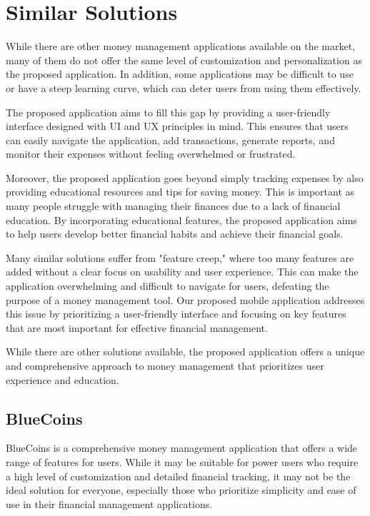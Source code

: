 \section{Similar Solutions}\label{sect:similar solutions}
\hspace{\parindent} While there are other money management applications available on the market, many of them do not offer the same level of customization and personalization as the proposed application. In addition, some applications may be difficult to use or have a steep learning curve, which can deter users from using them effectively.

\hspace{\parindent}The proposed application aims to fill this gap by providing a user-friendly interface designed with UI and UX principles in mind. This ensures that users can easily navigate the application, add transactions, generate reports, and monitor their expenses without feeling overwhelmed or frustrated.

\hspace{\parindent}Moreover, the proposed application goes beyond simply tracking expenses by also providing educational resources and tips for saving money. This is important as many people struggle with managing their finances due to a lack of financial education. By incorporating educational features, the proposed application aims to help users develop better financial habits and achieve their financial goals.


\hspace{\parindent}Many similar solutions suffer from "feature creep," where too many features are added without a clear focus on usability and user experience. This can make the application overwhelming and difficult to navigate for users, defeating the purpose of a money management tool. Our proposed mobile application addresses this issue by prioritizing a user-friendly interface and focusing on key features that are most important for effective financial management.

\hspace{\parindent}While there are other solutions available, the proposed application offers a unique and comprehensive approach to money management that prioritizes user experience and education.


\subsection{BlueCoins}
\hspace{\parindent}BlueCoins is a comprehensive money management application that offers a wide range of features for users. While it may be suitable for power users who require a high level of customization and detailed financial tracking, it may not be the ideal solution for everyone, especially those who prioritize simplicity and ease of use in their financial management applications.

